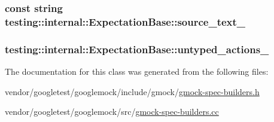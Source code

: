 \subsubsection[{\texorpdfstring{source\+\_\+text\+\_\+}{source_text_}}]{\setlength{\rightskip}{0pt plus 5cm}const {\bf string} testing\+::internal\+::\+Expectation\+Base\+::source\+\_\+text\+\_\+\hspace{0.3cm}{\ttfamily [protected]}}\hypertarget{classtesting_1_1internal_1_1ExpectationBase_a8803b5fa8354205a6b57e21a704acbef}{}\label{classtesting_1_1internal_1_1ExpectationBase_a8803b5fa8354205a6b57e21a704acbef}
\subsubsection[{\texorpdfstring{untyped\+\_\+actions\+\_\+}{untyped_actions_}}]{ testing\+::internal\+::\+Expectation\+Base\+::untyped\+\_\+actions\+\_\+\hspace{0.3cm}{\ttfamily [protected]}}\hypertarget{classtesting_1_1internal_1_1ExpectationBase_a9558ff6b8b1b7e3a99fac1f93d1826da}{}\label{classtesting_1_1internal_1_1ExpectationBase_a9558ff6b8b1b7e3a99fac1f93d1826da}


The documentation for this class was generated from the following files\+:\begin{DoxyCompactItemize}
\item 
vendor/googletest/googlemock/include/gmock/\hyperlink{gmock-spec-builders_8h}{gmock-\/spec-\/builders.\+h}\item 
vendor/googletest/googlemock/src/\hyperlink{gmock-spec-builders_8cc}{gmock-\/spec-\/builders.\+cc}\end{DoxyCompactItemize}
